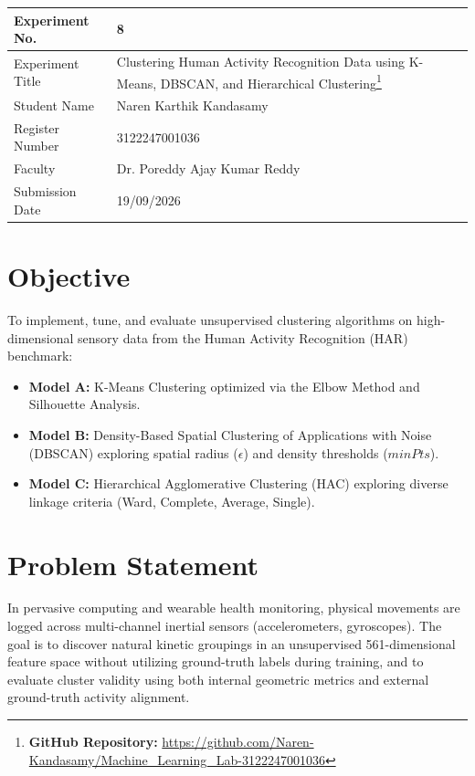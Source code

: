 \documentclass[12pt,a4paper]{article}
\begin{document}
\begin{tabular}{|p{4cm}|p{11cm}|}
\hline
Experiment No. & 8 \\ \hline
Experiment Title & Clustering Human Activity Recognition Data using K-Means, DBSCAN, and Hierarchical Clustering\footnote{\textbf{GitHub Repository: }\url{https://github.com/Naren-Kandasamy/Machine_Learning_Lab-3122247001036}}\\ \hline
Student Name & Naren Karthik Kandasamy \\ \hline
Register Number & 3122247001036 \\ \hline
Faculty & Dr. Poreddy Ajay Kumar Reddy \\ \hline
Submission Date & 19/09/2026 \\ \hline
\end{tabular}

\vspace{1em}

\section{Objective}
To implement, tune, and evaluate unsupervised clustering algorithms on high-dimensional sensory data from the Human Activity Recognition (HAR) benchmark:
\begin{itemize}[noitemsep]
    \item \textbf{Model A:} K-Means Clustering optimized via the Elbow Method and Silhouette Analysis.
    \item \textbf{Model B:} Density-Based Spatial Clustering of Applications with Noise (DBSCAN) exploring spatial radius ($\epsilon$) and density thresholds ($minPts$).
    \item \textbf{Model C:} Hierarchical Agglomerative Clustering (HAC) exploring diverse linkage criteria (Ward, Complete, Average, Single).
\end{itemize}

\section{Problem Statement}
In pervasive computing and wearable health monitoring, physical movements are logged across multi-channel inertial sensors (accelerometers, gyroscopes). The goal is to discover natural kinetic groupings in an unsupervised 561-dimensional feature space without utilizing ground-truth labels during training, and to evaluate cluster validity using both internal geometric metrics and external ground-truth activity alignment.
\end{document}
